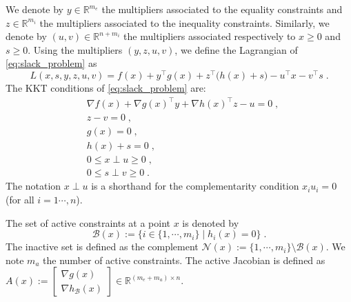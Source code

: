 We denote by $y \in \mathbb{R}^{m_e}$ the multipliers associated
to the equality constraints and $z \in \mathbb{R}^{m_i}$ the multipliers
associated to the inequality constraints. Similarly, we denote
by $(u, v) \in \mathbb{R}^{n + m_i}$ the multipliers associated
respectively to $x \geq 0$ and $s \geq 0$.
Using the multipliers $(y, z, u, v)$, we define the Lagrangian of \eqref{eq:slack_problem} as
\begin{equation}
  \label{eq:lagrangian}
  L(x, s, y, z, u, v) = f(x) + y^\top g(x) + z^\top \big(h(x) +s\big)
  - u^\top x - v^\top s \; .
\end{equation}
The KKT conditions of \eqref{eq:slack_problem} are:
\begin{subequations}
  \label{eq:kktconditions}
    \begin{align}
      & \nabla f(x) + \nabla g(x)^\top y + \nabla h(x)^\top z - u = 0 \; , \\
      & z - v = 0 \; , \\
      & g(x) = 0 \; , \\
      & h(x) + s = 0 \; , \\
      \label{eq:kktconditions:compx}
      & 0 \leq x \perp u \geq 0 \; , \\
      \label{eq:kktconditions:comps}
      & 0 \leq s \perp v \geq 0 \; .
    \end{align}
\end{subequations}
The notation $x \perp u$ is a shorthand for the complementarity
condition $x_i u_i = 0$ (for all $i=1\cdots, n$).

The set of active constraints at a point $x$ is denoted by
\begin{equation}
  \mathcal{B}(x) := \{ i \in\{ 1, \cdots, m_i\} \; | \; h_i(x) = 0 \} \; .
\end{equation}
The inactive set is defined as the complement $\mathcal{N}(x) := \{1, \cdots, m_i \} \setminus \mathcal{B}(x)$.
We note $m_a$ the number of active constraints.
The active Jacobian is defined as $A(x) := \begin{bmatrix} \nabla g(x) \\ \nabla h_{\mathcal{B}}(x) \end{bmatrix} \in \mathbb{R}^{(m_e + m_a) \times n}$.


